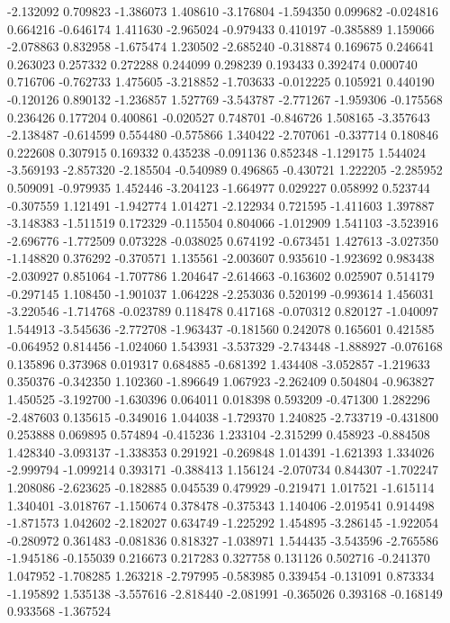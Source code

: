 -2.132092
0.709823
-1.386073
1.408610
-3.176804
-1.594350
0.099682
-0.024816
0.664216
-0.646174
1.411630
-2.965024
-0.979433
0.410197
-0.385889
1.159066
-2.078863
0.832958
-1.675474
1.230502
-2.685240
-0.318874
0.169675
0.246641
0.263023
0.257332
0.272288
0.244099
0.298239
0.193433
0.392474
0.000740
0.716706
-0.762733
1.475605
-3.218852
-1.703633
-0.012225
0.105921
0.440190
-0.120126
0.890132
-1.236857
1.527769
-3.543787
-2.771267
-1.959306
-0.175568
0.236426
0.177204
0.400861
-0.020527
0.748701
-0.846726
1.508165
-3.357643
-2.138487
-0.614599
0.554480
-0.575866
1.340422
-2.707061
-0.337714
0.180846
0.222608
0.307915
0.169332
0.435238
-0.091136
0.852348
-1.129175
1.544024
-3.569193
-2.857320
-2.185504
-0.540989
0.496865
-0.430721
1.222205
-2.285952
0.509091
-0.979935
1.452446
-3.204123
-1.664977
0.029227
0.058992
0.523744
-0.307559
1.121491
-1.942774
1.014271
-2.122934
0.721595
-1.411603
1.397887
-3.148383
-1.511519
0.172329
-0.115504
0.804066
-1.012909
1.541103
-3.523916
-2.696776
-1.772509
0.073228
-0.038025
0.674192
-0.673451
1.427613
-3.027350
-1.148820
0.376292
-0.370571
1.135561
-2.003607
0.935610
-1.923692
0.983438
-2.030927
0.851064
-1.707786
1.204647
-2.614663
-0.163602
0.025907
0.514179
-0.297145
1.108450
-1.901037
1.064228
-2.253036
0.520199
-0.993614
1.456031
-3.220546
-1.714768
-0.023789
0.118478
0.417168
-0.070312
0.820127
-1.040097
1.544913
-3.545636
-2.772708
-1.963437
-0.181560
0.242078
0.165601
0.421585
-0.064952
0.814456
-1.024060
1.543931
-3.537329
-2.743448
-1.888927
-0.076168
0.135896
0.373968
0.019317
0.684885
-0.681392
1.434408
-3.052857
-1.219633
0.350376
-0.342350
1.102360
-1.896649
1.067923
-2.262409
0.504804
-0.963827
1.450525
-3.192700
-1.630396
0.064011
0.018398
0.593209
-0.471300
1.282296
-2.487603
0.135615
-0.349016
1.044038
-1.729370
1.240825
-2.733719
-0.431800
0.253888
0.069895
0.574894
-0.415236
1.233104
-2.315299
0.458923
-0.884508
1.428340
-3.093137
-1.338353
0.291921
-0.269848
1.014391
-1.621393
1.334026
-2.999794
-1.099214
0.393171
-0.388413
1.156124
-2.070734
0.844307
-1.702247
1.208086
-2.623625
-0.182885
0.045539
0.479929
-0.219471
1.017521
-1.615114
1.340401
-3.018767
-1.150674
0.378478
-0.375343
1.140406
-2.019541
0.914498
-1.871573
1.042602
-2.182027
0.634749
-1.225292
1.454895
-3.286145
-1.922054
-0.280972
0.361483
-0.081836
0.818327
-1.038971
1.544435
-3.543596
-2.765586
-1.945186
-0.155039
0.216673
0.217283
0.327758
0.131126
0.502716
-0.241370
1.047952
-1.708285
1.263218
-2.797995
-0.583985
0.339454
-0.131091
0.873334
-1.195892
1.535138
-3.557616
-2.818440
-2.081991
-0.365026
0.393168
-0.168149
0.933568
-1.367524
